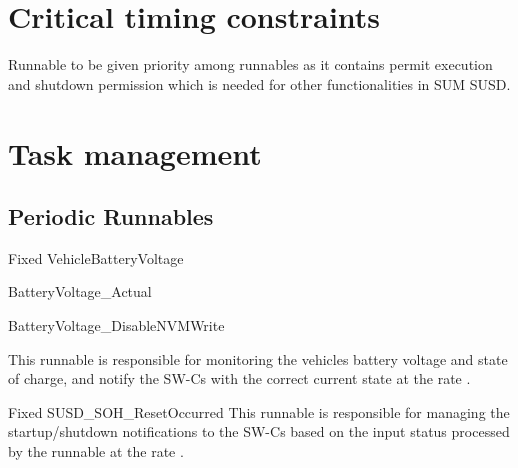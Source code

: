 

\section{Critical timing constraints}
Runnable  to be given priority among runnables as it contains permit execution and shutdown permission which is needed for other functionalities in SUM SUSD.

\section{Task management}

\subsection{Periodic Runnables}
\label{sec:periodic_runnables}

{
{Fixed}
{}
{VehicleBatteryVoltage}
{BatteryVoltage_Actual

BatteryVoltage_DisableNVMWrite}
{}
{}
{This runnable is responsible for monitoring the vehicles battery voltage and state of charge, and notify the SW-Cs with the correct current state at the rate .
}}
{     }

{
{Fixed}
{}
{SUSD_SOH_ResetOccurred}
{}
{}
{}
{This runnable is responsible for managing the startup/shutdown notifications to the SW-Cs based on the input status processed by the runnable at the rate .
}}
{  }

